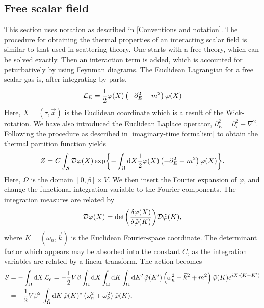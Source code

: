 \subsection{Free scalar field}

This section uses notation as described in \autoref{Conventions and notation}.
The procedure for obtaining the thermal properties of an interacting scalar field is similar to that used in scattering theory.
One starts with a free theory, which can be solved exactly.
Then an interaction term is added, which is accounted for peturbatively by using Feynman diagrams.
The Euclidean Lagrangian for a free scalar gas is, after integrating by parts,
\begin{equation}
    \mathcal{L}_E = \frac{1}{2} \varphi(X) \left( -\partial_E^2 + m^2 \right) \varphi(X)
\end{equation}
Here, $X = (\tau, \vec x)$ is the Euclidean coordinate which is a result of the Wick-rotation.
We have also introduced the Euclidean Laplace operator, $\partial_E^2 = \partial_\tau^2 + \nabla^2$.
Following the procedure as described in \autoref{imaginary-time formalism} to obtain the thermal partition function yields
\begin{equation}
    Z = C \int_S \mathcal{D} \varphi(X) 
    \exp{
        - \int_\Omega \dd X \frac{1}{2} 
        \varphi(X) \left( -\partial_E^2 + m^2 \right) \varphi(X)
    }.
\end{equation}
Here, $\Omega$ is the domain $[0, \beta] \times V$.
We then insert the Fourier expansion of $\varphi$, and change the functional integration variable to the Fourier components.
The integration measures are related by
\begin{equation*}
    \mathcal{D} \varphi(X) = \det(\frac{\delta \varphi(X)}{\delta \tilde \varphi(K)}) \mathcal{D}\tilde \varphi(K),
\end{equation*}
where $K = (\omega_n, \vec k)$ is the Euclidean Fourier-space coordinate.
The determinant factor which appears may be absorbed into the constant $C$, as the integration variables are related by a linear transform.
The action becomes 
\begin{align*}
    S & = - \int_\Omega \dd X\, \mathcal{L}_e 
    = - \frac{1}{2} V \beta \int_\Omega \dd X \int_{\tilde \Omega} \dd K \int_{\tilde \Omega} \dd K' \,
    \tilde \varphi(K') 
    \left(
        \omega_n^2 + \vec k^2 + m^2
    \right)
    \tilde \varphi(K)
    e^{iX\cdot(K - K')} \\
    & = - \frac{1}{2} V \beta^2 \, \int_{\tilde \Omega} \dd K \,
    \tilde \varphi(K)^*
    \left(
        \omega_n^2 + \omega_k^2
    \right)
    \tilde \varphi(K),
\end{align*}

